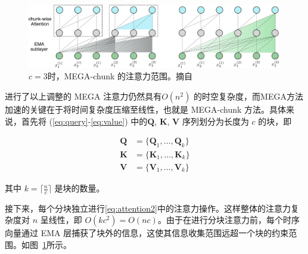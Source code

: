 \begin{figure}[t]
\centering
\includegraphics[width=0.99\textwidth]{figs/mega/ema_chunk_attn.pdf}
\caption{$c=3$时，MEGA-chunk 的注意力范围。摘自~\cite{ma2023mega}}
\label{fig:chunk}
\vspace{-3mm}
\end{figure}

进行了以上调整的 MEGA 注意力仍然具有$O(n^2)$ 的时空复杂度，而MEGA方法加速的关键在于将时间复杂度压缩至线性，也就是 MEGA-chunk 方法。具体来说，首先将 (\ref{eq:query}-\ref{eq:value}) 中的$\boldsymbol{Q}$, $\boldsymbol{K}$, $\boldsymbol{V}$ 序列划分为长度为 $c$ 的块，即

\begin{align}
    \boldsymbol{Q} & = \{\boldsymbol{Q}_1, \ldots,  \boldsymbol{Q}_k\} \\
    \boldsymbol{K} & = \{\boldsymbol{K}_1, \ldots,  \boldsymbol{K}_k\} \\
    \boldsymbol{V} & = \{\boldsymbol{V}_1, \ldots,  \boldsymbol{V}_k\} 
\end{align}

其中 $k = \lceil \frac n c \rceil$ 是块的数量。

接下来，每个分块独立进行\eqref{eq:attention2}中的注意力操作。这样整体的注意力复杂度对 $n$ 呈线性，即 $O(kc^2)=O(nc)$。由于在进行分块注意力前，每个时序向量通过 EMA 层捕获了块外的信息，这使其信息收集范围远超一个块的约束范围。如图~\ref{fig:chunk}所示。